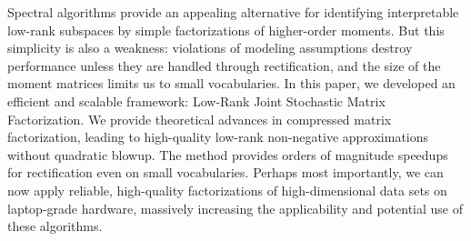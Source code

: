 Spectral algorithms provide an appealing alternative for identifying
interpretable low-rank subspaces by simple factorizations of higher-order
moments. But this simplicity is also a weakness: violations of modeling
assumptions destroy performance unless they are handled through rectification,
and the size of the moment matrices limits us to small vocabularies. In this
paper, we developed an efficient and scalable framework: Low-Rank Joint
Stochastic Matrix Factorization. We provide theoretical advances in compressed
matrix factorization, leading to high-quality low-rank non-negative
approximations without quadratic blowup. The method provides orders of magnitude
speedups for rectification even on small vocabularies. Perhaps most importantly,
we can now apply reliable, high-quality factorizations of high-dimensional data
sets on laptop-grade hardware, massively increasing the applicability and
potential use of these algorithms.